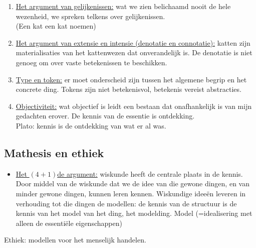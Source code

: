 \documentclass[11pt,a4paper]{article}
\begin{document}
\begin{enumerate}
\item \underline{Het argument van gelijkenissen:} wat we zien belichaamd nooit de hele wezenheid, we spreken telkens over gelijkenissen.
\\
(Een kat een kat noemen)
\item \underline{Het argument van extensie en intensie (denotatie en connotatie):} katten zijn materialisaties van het kattenwezen dat onverandelijk is. De denotatie is niet genoeg om over vaste betekenissen te beschikken.
\item \underline{Type en token:} er moet onderscheid zijn tussen het algemene begrip en het concrete ding. Tokens zijn niet betekenisvol, betekenis vereist abstracties.
\item \underline{Objectiviteit:} wat objectief is leidt een bestaan dat onafhankelijk is van mijn gedachten erover. De kennis van de essentie is ontdekking.
\\
Plato: kennis is de ontdekking van wat er al was.
\end{enumerate}
\subsection{Mathesis en ethiek}
\begin{itemize}
\item \underline{Het $(4+1)$de argument:}
wiskunde heeft de centrale plaats in de kennis.
Door middel van de wiskunde dat we de idee van die gewone dingen, en van minder gewone dingen, kunnen leren kennen.
Wiskundige ideeën leveren in verhouding tot die dingen de modellen: de kennis van de structuur is de kennis van het model van het ding, het modelding.  Model (=idealisering met alleen de essentiële eigenschappen)
\end{itemize}
Ethiek: modellen voor het menselijk handelen.
\end{document}
